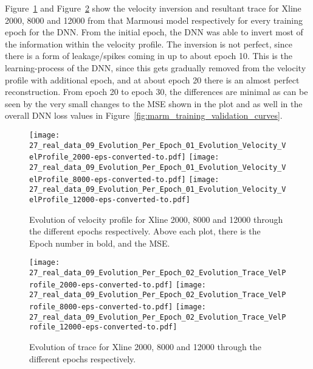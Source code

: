 Figure~\ref{fig:marm_evolution_velocity_profile} and Figure~\ref{fig:marm_evolution_trace} show the velocity inversion and resultant trace for Xline 2000, 8000 and 12000 from that Marmousi model respectively for every training epoch for the DNN. From the initial epoch, the DNN was able to invert most of the information within the velocity profile. The inversion is not perfect, since there is a form of leakage/spikes coming in up to about epoch 10. This is the learning-process of the DNN, since this gets gradually removed from the velocity profile with additional epoch, and at about epoch 20 there is an almost perfect reconstruction. From epoch 20 to epoch 30, the differences are minimal as can be seen by the very small changes to the MSE shown in the plot and as well in the overall DNN loss values in Figure~\ref{fig:marm_training_validation_curves}. 

\begin{figure}[ht!]
    \centering
    \texttt{[image: 27\_real\_data\_09\_Evolution\_Per\_Epoch\_01\_Evolution\_Velocity\_VelProfile\_2000-eps-converted-to.pdf]}
    \texttt{[image: 27\_real\_data\_09\_Evolution\_Per\_Epoch\_01\_Evolution\_Velocity\_VelProfile\_8000-eps-converted-to.pdf]}
    \texttt{[image: 27\_real\_data\_09\_Evolution\_Per\_Epoch\_01\_Evolution\_Velocity\_VelProfile\_12000-eps-converted-to.pdf]}
    \caption[Evolution of velocity profile through different epochs.]{Evolution of velocity profile for Xline 2000, 8000 and 12000 through the different epochs respectively. Above each plot, there is the Epoch number in bold, and the MSE.}
    \label{fig:marm_evolution_velocity_profile}
\end{figure}

\begin{figure}[ht!]
    \centering
    \texttt{[image: 27\_real\_data\_09\_Evolution\_Per\_Epoch\_02\_Evolution\_Trace\_VelProfile\_2000-eps-converted-to.pdf]}
    \texttt{[image: 27\_real\_data\_09\_Evolution\_Per\_Epoch\_02\_Evolution\_Trace\_VelProfile\_8000-eps-converted-to.pdf]}
    \texttt{[image: 27\_real\_data\_09\_Evolution\_Per\_Epoch\_02\_Evolution\_Trace\_VelProfile\_12000-eps-converted-to.pdf]}
    \caption[Evolution of trace for Xline 2000, 8000 and 12000 through the different epochs.]{Evolution of trace for Xline 2000, 8000 and 12000 through the different epochs respectively.}
    \label{fig:marm_evolution_trace}
\end{figure}

\clearpage
